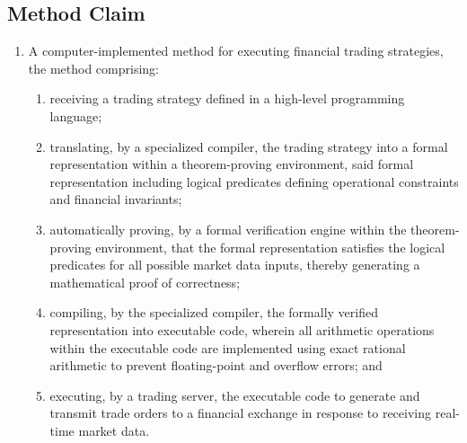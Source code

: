\documentclass{article}
\begin{document}
\subsection{Method Claim}
\begin{enumerate}[label=1.]
    \item A computer-implemented method for executing financial trading strategies, the method comprising:
    \begin{enumerate}[label=(\alph*)]
        \item receiving a trading strategy defined in a high-level programming language;
        \item translating, by a specialized compiler, the trading strategy into a formal representation within a theorem-proving environment, said formal representation including logical predicates defining operational constraints and financial invariants;
        \item automatically proving, by a formal verification engine within the theorem-proving environment, that the formal representation satisfies the logical predicates for all possible market data inputs, thereby generating a mathematical proof of correctness;
        \item compiling, by the specialized compiler, the formally verified representation into executable code, wherein all arithmetic operations within the executable code are implemented using exact rational arithmetic to prevent floating-point and overflow errors; and
        \item executing, by a trading server, the executable code to generate and transmit trade orders to a financial exchange in response to receiving real-time market data.
    \end{enumerate}
\end{enumerate}
\end{document}
